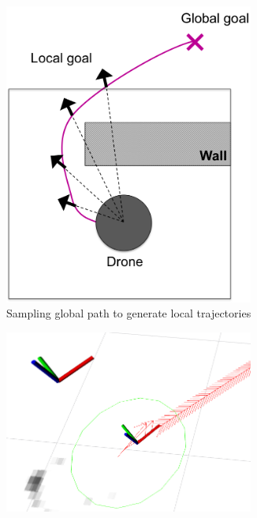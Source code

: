 \documentclass[capstone_report.tex]{subfiles}
\begin{document}
\begin{figure}[H]
    \centering
    \begin{subfigure}[b]{0.33\textwidth}
        \centering
        \includegraphics[width=0.9\textwidth]{imgs/sample_global.png}
        \caption{Sampling global path to generate local trajectories}
    \end{subfigure}%
    \begin{subfigure}[b]{0.33\textwidth}
        \centering
        \includegraphics[width=0.9\textwidth]{imgs/one_local_traj_large.png}

\end{subfigure}
\end{figure}
\end{document}
